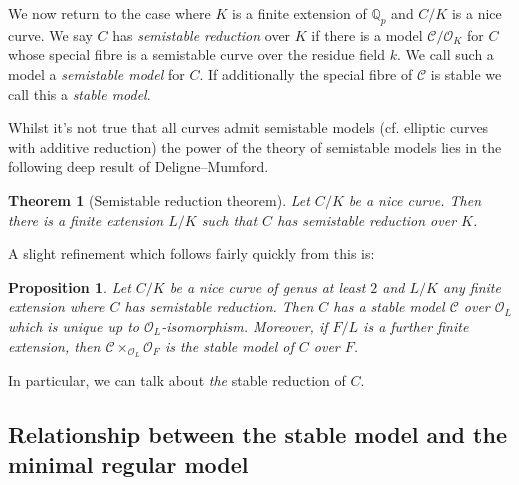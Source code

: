 \documentclass[12pt]{amsart}
\numberwithin{equation}{section}
\newtheorem{theorem}[equation]{Theorem}
\newtheorem{proposition}[equation]{Proposition}
\theoremstyle{remark}
\theoremstyle{definition}
\theoremstyle{definition}
\theoremstyle{definition}
\theoremstyle{definition}
\theoremstyle{definition}
\theoremstyle{definition}
\begin{document}
We now return to the case where $K$ is a finite extension of $\mathbb{Q}_p$ and $C/K$ is a nice curve. We say $C$ has \textit{semistable reduction} over $K$ if there is a model $\mathcal{C}/\mathcal{O}_K$ for $C$ whose special fibre is a semistable curve over the residue field $k$. We call such a model a \textit{semistable model} for $C$. If additionally the special fibre of $\mathcal{C}$ is stable we call this a \textit{stable model}.

Whilst it's not true that all curves admit semistable models (cf. elliptic curves with additive reduction) the power of the theory of semistable models lies in the following deep result of Deligne--Mumford.

\begin{theorem}[Semistable reduction theorem]
Let $C/K$ be a nice curve. Then there is a finite extension $L/K$ such that $C$ has semistable reduction over $K$.
\end{theorem}

A slight refinement which follows fairly quickly from this is:

\begin{proposition} 
Let $C/K$ be a nice curve of genus at least $2$ and $L/K$ any finite extension where $C$ has semistable reduction. Then $C$ has a stable model $\mathcal{C}$ over $\mathcal{O}_L$ which is unique up to $\mathcal{O}_L$-isomorphism. Moreover, if $F/L$ is a further finite extension, then $\mathcal{C}\times_{\mathcal{O}_L}\mathcal{O}_F$ is the stable model of $C$ over $F$.
\end{proposition}

In particular, we can talk about \textit{the} stable reduction of $C$.

\subsection{Relationship between the stable model and the minimal regular model}
\end{document}
